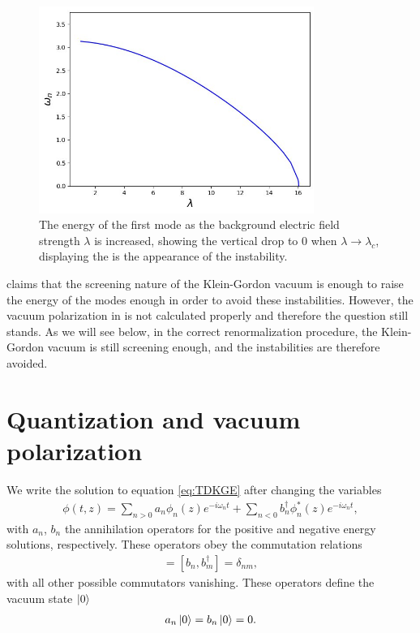 \begin{figure}[t]
	\centering
	\includegraphics[width=0.8\textwidth]{figures/eigenvalues-external-field-approximation.png}
	\caption{The energy of the first mode as the background electric field strength $\lambda$ is increased, showing the vertical drop to 0 when $\lambda\to \lambda_c$, displaying the is the appearance of the instability. }
	\label{fig:figures-eigenvalues-external-field-approximation-png}
\end{figure}

\cite{Ambjorn1983} claims that the screening nature of the Klein-Gordon vacuum is enough to raise the energy of the modes enough in order to avoid these instabilities. However, the vacuum polarization in \cite{Ambjorn1983} is not calculated properly \cite{Wernersson2020} and therefore the question still stands. As we will see below, in the correct renormalization procedure, the Klein-Gordon vacuum is still screening enough, and the instabilities are therefore avoided.

		\section{Quantization and vacuum polarization}


		We write the solution to equation \eqref{eq:TDKGE} after changing the variables
		\begin{align}
			\phi(t, z) = \sum_{n>0}^{} a_n \phi_n(z) e^{-i\omega_n t} + \sum_{n<0}^{} b_n^\dagger \phi_n^*(z) e^{-i\omega_n t},
			\label{eq:field-expansion}
		\end{align}
		with $a_n$, $b_n$ the annihilation operators for the positive and negative energy solutions, respectively. These operators obey the commutation relations 
		\begin{align}
			[a_n, a_m^\dagger] =
			[b_n, b_m^\dagger] = \delta_{nm},
		\end{align}
		with all other possible commutators vanishing. These operators define the vacuum state $\ket{0} $ 
		\begin{align}
			a_n \ket{0} = b_n \ket{0} = 0.
		\end{align}

